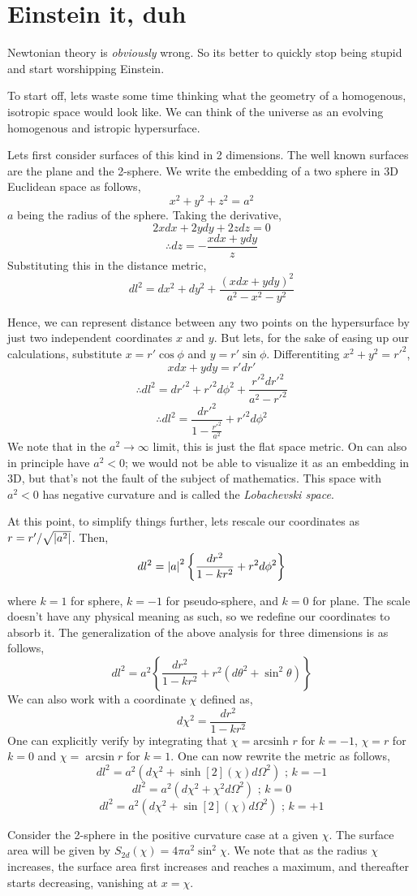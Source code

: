 \documentclass[a4paper,11pt]{report}
\begin{document}
\section{Einstein it, duh}
Newtonian theory is \textit{obviously} wrong. So its better to quickly stop being stupid and start worshipping Einstein.

To start off, lets waste some time thinking what the geometry of a homogenous, isotropic space would look like. We can think of the universe as an evolving homogenous and istropic hypersurface.

Lets first consider surfaces of this kind in 2 dimensions. The well known surfaces are the plane and the 2-sphere. We write the embedding of a two sphere in 3D Euclidean space as follows,
$$x^2 + y^2 + z^2 = a^2$$
$a$ being the radius of the sphere. Taking the derivative,
$$2x dx + 2y dy +2z dz = 0$$
$$\therefore dz = -\frac{xdx + ydy}{z}$$
Substituting this in the distance metric,
$$dl^2 = dx^2 + dy^2 + \frac{(xdx + ydy)^2}{a^2 - x^2 - y^2}$$

Hence, we can represent distance between any two points on the hypersurface by just two independent coordinates $x$ and $y$. But lets, for the sake of easing up our calculations, substitute $x = r' \cos\phi$ and $y = r' \sin \phi$. Differentiting $x^2 + y^2 = r'^2$,
$$xdx + ydy = r' dr'$$
$$\therefore dl^2 = dr'^2 + r'^2d\phi^2 + \frac{r'^2 dr'^2}{a^2 - r'^2}$$
$$\therefore dl^2 = \frac{dr'^2 }{1 - \frac{r'^2}{a^2}} + r'^2d\phi^2 $$
We note that in the $a^2 \rightarrow \infty$ limit, this is just the flat space metric. On can also in principle have $a^2 < 0$; we would not be able to visualize it as an embedding in 3D, but that's not the fault of the subject of mathematics. This space with $a^2 < 0$ has negative curvature and is called the \textit{Lobachevski space}.

At this point, to simplify things further, lets rescale our coordinates as $r = r'/\sqrt{\abs{a^2}}$. Then,
$$dl^2 = \abs{a}^2\left\{\frac{dr^2}{1 - k{r^2}} + r^2d\phi^2 \right\}$$

where $k=1$ for sphere, $k=-1$ for pseudo-sphere, and $k=0$ for plane. The scale doesn't have any physical meaning as such, so we redefine our coordinates to absorb it. The generalization of the above analysis for three dimensions is as follows,
$$dl^2 = a^2\left\{\frac{dr^2}{1 - k{r^2}} + r^2(d\theta^2 + \sin^2\theta) \right\}$$
We can also work with a coordinate $\chi$ defined as,
$$d\chi^2 = \frac{dr^2}{1-kr^2}$$ One can explicitly verify by integrating that $\chi = \text{arcsinh } r$ for $k = -1$, $\chi = r$ for $k=0$ and $\chi = \arcsin r$ for $k=1$. One can now rewrite the metric as follows,
$$dl^2 = a^2(d\chi^2 + \sinh[2](\chi)d \Omega^2) \text{ ; } k = -1$$
$$dl^2 = a^2(d\chi^2 + \chi^2 d \Omega^2) \text{ ; } k = 0$$
$$dl^2 = a^2(d\chi^2 + \sin[2](\chi)d \Omega^2) \text{ ; } k = +1$$

Consider the 2-sphere in the positive curvature case at a given $\chi$. The surface area will be given by $S_{2d}(\chi) = 4 \pi a^2 \sin^2 \chi$. We note that as the radius $\chi$ increases, the surface area first increases and reaches a maximum, and thereafter starts decreasing, vanishing at $x=\chi$.
\end{document}
